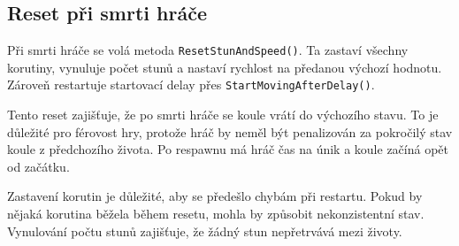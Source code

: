 \subsection{Reset při smrti hráče}

Při smrti hráče se volá metoda \texttt{ResetStunAndSpeed()}. Ta zastaví všechny korutiny, vynuluje počet stunů a nastaví rychlost na předanou výchozí hodnotu. Zároveň restartuje startovací delay přes \texttt{StartMovingAfterDelay()}.

Tento reset zajišťuje, že po smrti hráče se koule vrátí do výchozího stavu. To je důležité pro férovost hry, protože hráč by neměl být penalizován za pokročilý stav koule z předchozího života. Po respawnu má hráč čas na únik a koule začíná opět od začátku.

Zastavení korutin je důležité, aby se předešlo chybám při restartu. Pokud by nějaká korutina běžela během resetu, mohla by způsobit nekonzistentní stav. Vynulování počtu stunů zajišťuje, že žádný stun nepřetrvává mezi životy.